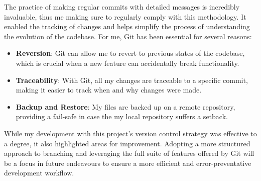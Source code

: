 \documentclass{article}
\begin{document}
The practice of making regular commits with detailed messages is incredibly invaluable, thus me making sure to regularly comply with this methodology. It enabled the tracking of changes and helps simplify the process of understanding the evolution of the codebase. For me, Git has been essential for several reasons:

\begin{itemize}
    \item \textbf{Reversion}: Git can allow me to revert to previous states of the codebase, which is crucial when a new feature can accidentally break functionality.
    \item \textbf{Traceability}: With Git, all my changes are traceable to a specific commit, making it easier to track when and why changes were made.
    \item \textbf{Backup and Restore}: My files are backed up on a remote repository, providing a fail-safe in case the my local repository suffers a setback.
\end{itemize}

While my development with this project's version control strategy was effective to a degree, it also highlighted areas for improvement. Adopting a more structured approach to branching and leveraging the full suite of features offered by Git will be a focus in future endeavours to ensure a more efficient and error-preventative development workflow.



\end{document}
